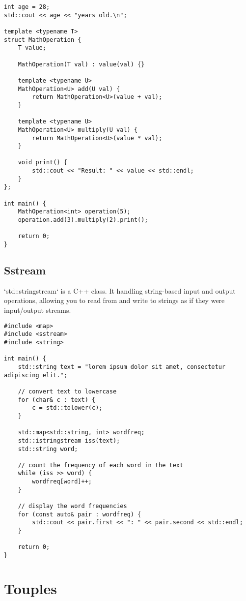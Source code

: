 \begin{verbatim}
int age = 28;
std::cout << age << "years old.\n";

template <typename T>
struct MathOperation {
    T value;

    MathOperation(T val) : value(val) {}

    template <typename U>
    MathOperation<U> add(U val) {
        return MathOperation<U>(value + val);
    }

    template <typename U>
    MathOperation<U> multiply(U val) {
        return MathOperation<U>(value * val);
    }

    void print() {
        std::cout << "Result: " << value << std::endl;
    }
};

int main() {
    MathOperation<int> operation(5);
    operation.add(3).multiply(2).print();

    return 0;
}
\end{verbatim}

\subsection{Sstream}

`std::stringstream` is a C++ class. It handling string-based input and output operations,
allowing you to read from and write to strings as if they were input/output streams.

\begin{verbatim}
#include <map>
#include <sstream>
#include <string>

int main() {
    std::string text = "lorem ipsum dolor sit amet, consectetur adipiscing elit.";

    // convert text to lowercase
    for (char& c : text) {
        c = std::tolower(c);
    }

    std::map<std::string, int> wordfreq;
    std::istringstream iss(text);
    std::string word;

    // count the frequency of each word in the text
    while (iss >> word) {
        wordfreq[word]++;
    }

    // display the word frequencies
    for (const auto& pair : wordfreq) {
        std::cout << pair.first << ": " << pair.second << std::endl;
    }

    return 0;
}
\end{verbatim}


\section{Touples}


